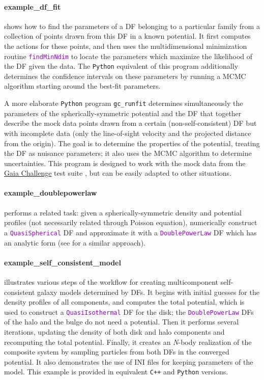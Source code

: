 \documentclass[12pt]{article}
\newcommand{\Nbody}{\textsl{N}-body\xspace}
\newcommand{\Cpp}  {\texttt{C++}\xspace}
\newcommand{\Python}{\texttt{Python}\xspace}
\newcommand{\ttt}[1]{\textcolor{darkviolet}{\texttt{#1}}}
\begin{document}
\paragraph{example_df_fit} shows how to find the parameters of a DF belonging to a particular family from a collection of points drawn from this DF in a known potential. It first computes the actions for these points, and then uses the multidimensional minimization routine \ttt{findMinNdim} to locate the parameters which maximize the likelihood of the DF given the data.
The \Python equivalent of this program additionally determines the confidence intervals on these parameters by running a MCMC algorithm starting around the best-fit parameters.

A more elaborate \Python program \texttt{gc_runfit} determines simultaneously the parameters of the spherically-symmetric potential and the DF that together describe the mock data points drawn from a certain (non-self-consistent) DF but with incomplete data (only the line-of-sight velocity and the projected distance from the origin). The goal is to determine the properties of the potential, treating the DF as nuisance parameters; it also uses the MCMC algorithm to determine uncertainties. 
This program is designed to work with the mock data from the \href{http://astrowiki.ph.surrey.ac.uk/dokuwiki/doku.php?id=tests:sphtri:spherical}{Gaia Challenge} test suite \cite{Read2020}, but can be easily adapted to other situations.

\paragraph{example_doublepowerlaw} performs a related task: given a spherically-symmetric density and potential profiles (not necessarily related through Poisson equation), numerically construct a \ttt{QuasiSpherical} DF and approximate it with a \ttt{DoublePowerLaw} DF which has an analytic form (see \cite{Jeffreson2017} for a similar approach).

\paragraph{example_self_consistent_model} illustrates various steps of the workflow for creating multicomponent self-consistent galaxy models determined by DFs. It begins with initial guesses for the density profiles of all components, and computes the total potential, which is used to construct a \ttt{QuasiIsothermal} DF for the disk; the \ttt{DoublePowerLaw} DFs of the halo and the bulge do not need a potential. Then it performs several iterations, updating the density of both disk and halo components and recomputing the total potential. Finally, it creates an \Nbody realization of the composite system by sampling particles from both DFs in the converged potential. It also demonstrates the use of INI files for keeping parameters of the model. This example is provided in equivalent \Cpp and \Python versions.
\end{document}
